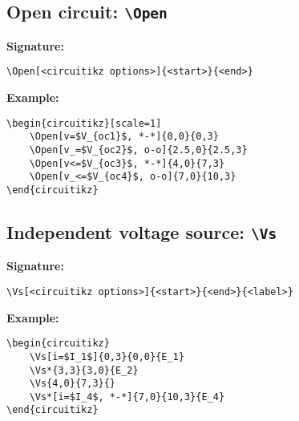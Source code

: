 \documentclass[a4paper,12pt]{article}
\begin{document}
\begin{center}
\begin{circuitikz}[scale=1]
\end{circuitikz}
\end{center}


\subsection{Open circuit: \texttt{\textbackslash Open}}

\textbf{Signature:}
\begin{verbatim}
\Open[<circuitikz options>]{<start>}{<end>}
\end{verbatim}

\textbf{Example:}

\begin{lstlisting}[style=latexstyle]
\begin{circuitikz}[scale=1]
	\Open[v=$V_{oc1}$, *-*]{0,0}{0,3}
	\Open[v_=$V_{oc2}$, o-o]{2.5,0}{2.5,3}
	\Open[v<=$V_{oc3}$, *-*]{4,0}{7,3}
	\Open[v_<=$V_{oc4}$, o-o]{7,0}{10,3}
\end{circuitikz}
\end{lstlisting}


\begin{center}
\begin{circuitikz}[scale=1]
\end{circuitikz}
\end{center}

\subsection{Independent voltage source: \texttt{\textbackslash Vs}}

\textbf{Signature:}
\begin{verbatim}
\Vs[<circuitikz options>]{<start>}{<end>}{<label>}
\end{verbatim}

\textbf{Example:}

\begin{lstlisting}[style=latexstyle]
\begin{circuitikz}
    \Vs[i=$I_1$]{0,3}{0,0}{E_1}
    \Vs*{3,3}{3,0}{E_2}
    \Vs{4,0}{7,3}{}
    \Vs*[i=$I_4$, *-*]{7,0}{10,3}{E_4}
\end{circuitikz}
\end{lstlisting}
\end{document}
